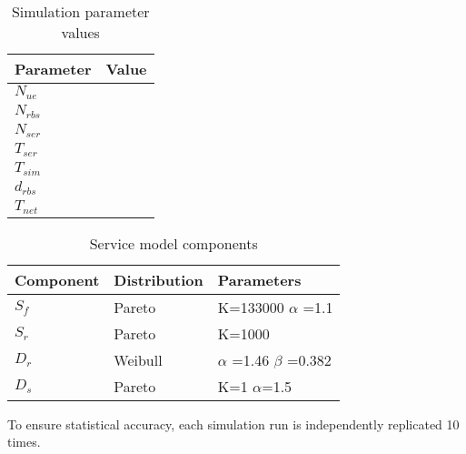\begin{table}[tb]
 	\centering
 	
    \begin{tabular}{|l|l|} \hline
    	\textbf{Parameter}    		& \textbf{Value} \\ \hline
    	$N_{ue}$					& \\ \hline
    	$N_{rbs}$     			& \\ \hline
    	$N_{ser}$ 				& \\ \hline
    	$T_{ser}$  				& \\ \hline
    	$T_{sim}$ 				& \\ \hline
    	$d_{rbs}$					& \\ \hline
    	$T_{net}$					& \\ \hline
    \end{tabular}
    
    \caption{Simulation parameter values}
    \label{table:simulation_parameters}
\end{table}

\begin{table}[tb]
	\centering
	
    \begin{tabular}{|l|l|l|}\hline
    	\textbf{Component}  	& \textbf{Distribution} 	& \textbf{Parameters}     \\ \hline
    	$S_f$   	& Pareto   				& K=133000 $\alpha$ =1.1  \\ \hline
    	$S_r$   	& Pareto    				& K=1000         \\ \hline
    	$D_r$ 	& Weibull    				& $\alpha$ =1.46 $\beta$ =0.382 \\ \hline
    	$D_s$ 	& Pareto     				& K=1 $\alpha$=1.5      \\ \hline
    \end{tabular}
    
    \caption{Service model components}
    \label{table:traffic_parameters}
\end{table}

To ensure statistical accuracy, each simulation run is independently replicated 10 times.